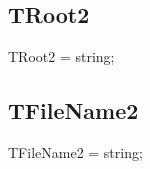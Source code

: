 \documentclass{report}
\begin{document}
\subsection*{TRoot2}
\begin{list}{}{
\setlength{\itemindent}{0cm}
\setlength{\listparindent}{0cm}
\setlength{\leftmargin}{\evensidemargin}
\addtolength{\leftmargin}{\tmplength}
\settowidth{\labelsep}{X}
\addtolength{\leftmargin}{\labelsep}
\setlength{\labelwidth}{\tmplength}
}
\begin{flushleft}
\item[\textbf{Declaration}\hfill]
\begin{ttfamily}
TRoot2 = string;\end{ttfamily}


\end{flushleft}
\end{list}
\subsection*{TFileName2}
\begin{list}{}{
\setlength{\itemindent}{0cm}
\setlength{\listparindent}{0cm}
\setlength{\leftmargin}{\evensidemargin}
\addtolength{\leftmargin}{\tmplength}
\settowidth{\labelsep}{X}
\addtolength{\leftmargin}{\labelsep}
\setlength{\labelwidth}{\tmplength}
}
\begin{flushleft}
\item[\textbf{Declaration}\hfill]
\begin{ttfamily}
TFileName2 = string;\end{ttfamily}


\end{flushleft}
\end{list}
\end{document}

